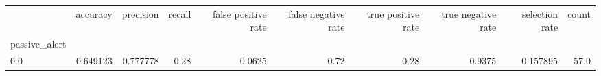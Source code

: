 \begin{tabular}{lrrrrrrrrr}
\toprule
{} &  accuracy &  precision &  recall &  false positive rate &  false negative rate &  true positive rate &  true negative rate &  selection rate &  count \\
passive\_alert &           &            &         &                      &                      &                     &                     &                 &        \\
\midrule
0.0           &  0.649123 &   0.777778 &    0.28 &               0.0625 &                 0.72 &                0.28 &              0.9375 &        0.157895 &   57.0 \\
\bottomrule
\end{tabular}
